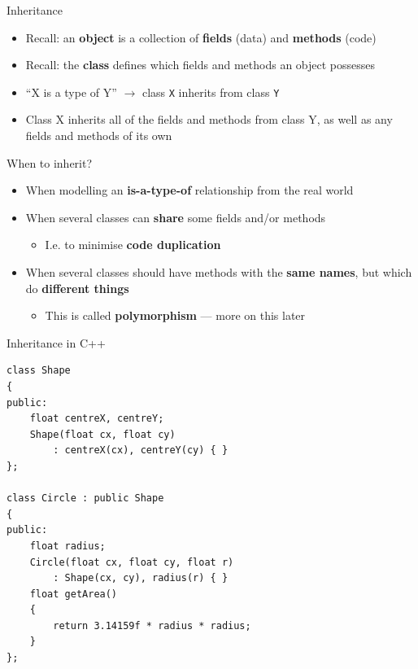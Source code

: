 \begin{frame}{Inheritance}
\begin{itemize}
	\pause\item Recall: an \textbf{object} is a collection of \textbf{fields} (data) and \textbf{methods} (code)
	\pause\item Recall: the \textbf{class} defines which fields and methods an object possesses
	\pause\item ``X is a type of Y'' $\to$ class \lstinline{X} inherits from class \lstinline{Y}
	\pause\item Class X inherits all of the fields and methods from class Y, as well as any fields and methods of its own
\end{itemize}
\end{frame}

\begin{frame}{When to inherit?}
\begin{itemize}
	\pause\item When modelling an \textbf{is-a-type-of} relationship from the real world
	\pause\item When several classes can \textbf{share} some fields and/or methods
	\begin{itemize}
		\pause\item I.e. to minimise \textbf{code duplication}
	\end{itemize}
	\pause\item When several classes should have methods with the \textbf{same names}, but which do \textbf{different things}
	\begin{itemize}
		\pause\item This is called \textbf{polymorphism} --- more on this later
	\end{itemize}
\end{itemize}
\end{frame}

\begin{frame}[fragile]{Inheritance in C++}
	\begin{lstlisting}
class Shape
{
public:
    float centreX, centreY;
    Shape(float cx, float cy)
    	: centreX(cx), centreY(cy) { }
};

class Circle : public Shape
{
public:
    float radius;
    Circle(float cx, float cy, float r)
        : Shape(cx, cy), radius(r) { }
    float getArea()
    {
    	return 3.14159f * radius * radius;
    }
};
	\end{lstlisting}
\end{frame}

